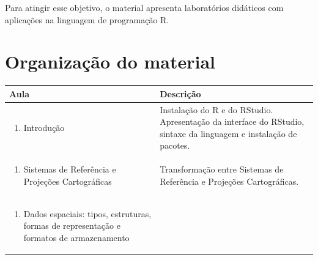 \documentclass[
  letterpaper,
  DIV=11,
  numbers=noendperiod]{scrreprt}
\providecommand{\tightlist}{%
  \setlength{\itemsep}{0pt}\setlength{\parskip}{0pt}}
\begin{document}
Para atingir esse objetivo, o material apresenta laboratórios didáticos
com aplicações na linguagem de programação R.

\section*{Organização do material}\label{organizauxe7uxe3o-do-material}


\begin{longtable}[]{@{}
  >{\raggedright\arraybackslash}p{}
  >{\raggedright\arraybackslash}p{}@{}}
\toprule\noalign{}
\begin{minipage}[b]{\linewidth}\raggedright
Aula
\end{minipage} & \begin{minipage}[b]{\linewidth}\raggedright
Descrição
\end{minipage} \\
\midrule\noalign{}
\endhead
\bottomrule\noalign{}
\endlastfoot
\begin{minipage}[t]{\linewidth}\raggedright
\begin{enumerate}
\def\labelenumi{\arabic{enumi}.}
\tightlist
\item
  Introdução
\end{enumerate}
\end{minipage} & Instalação do R e do RStudio. Apresentação da interface
do RStudio, sintaxe da linguagem e instalação de pacotes. \\
\begin{minipage}[t]{\linewidth}\raggedright
\begin{enumerate}
\def\labelenumi{\arabic{enumi}.}
\setcounter{enumi}{1}
\tightlist
\item
  Sistemas de Referência e Projeções Cartográficas
\end{enumerate}
\end{minipage} & Transformação entre Sistemas de Referência e Projeções
Cartográficas. \\
\begin{minipage}[t]{\linewidth}\raggedright
\begin{enumerate}
\def\labelenumi{\arabic{enumi}.}
\setcounter{enumi}{2}
\tightlist
\item
  Dados espaciais: tipos, estruturas, formas de representação e formatos
  de armazenamento

\end{enumerate}
\end{minipage}
\end{longtable}
\end{document}
